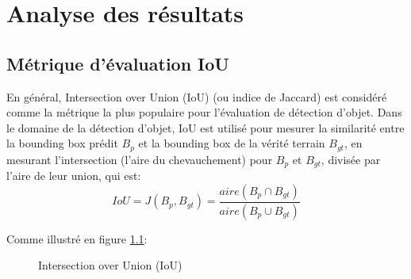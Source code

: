 \chapter{Analyse des résultats}

\section{Métrique d'évaluation IoU}
En général, Intersection over Union (IoU) (ou indice de Jaccard) est considéré comme la métrique la plus populaire pour l'évaluation de détection d'objet. Dans le domaine de la détection d'objet, IoU est utilisé pour mesurer la similarité entre la bounding box prédit $B_{p}$ et la bounding box de la vérité terrain $B_{gt}$, en mesurant l'intersection (l'aire du chevauchement) pour $B_{p}$ et $B_{gt}$, divisée par l'aire de leur union, qui est:
$$IoU=J(B_{p}, B_{gt})=\frac{aire(B_{p} \cap B_{gt})}{aire(B_{p} \cup B_{gt})}$$
 
Comme illustré en figure \ref{fig:iou_example}:

\begin{figure}[!htbp]
\center
\caption{Intersection over Union (IoU)}
\label{fig:iou_example}
\end{figure}
\FloatBarrier

